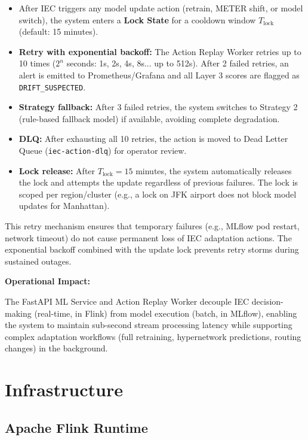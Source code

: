 \begin{itemize}
    \item After IEC triggers any model update action (retrain, METER shift, or model switch), the system enters a \textbf{Lock State} for a cooldown window $T_{\text{lock}}$ (default: 15 minutes).
    \item \textbf{Retry with exponential backoff:} The Action Replay Worker retries up to 10 times ($2^n$ seconds: 1s, 2s, 4s, 8s... up to 512s). After 2 failed retries, an alert is emitted to Prometheus/Grafana and all Layer 3 scores are flagged as \texttt{DRIFT\_SUSPECTED}.
    \item \textbf{Strategy fallback:} After 3 failed retries, the system switches to Strategy 2 (rule-based fallback model) if available, avoiding complete degradation.
    \item \textbf{DLQ:} After exhausting all 10 retries, the action is moved to Dead Letter Queue (\texttt{iec-action-dlq}) for operator review.
    \item \textbf{Lock release:} After $T_{\text{lock}} = 15$ minutes, the system automatically releases the lock and attempts the update regardless of previous failures. The lock is scoped per region/cluster (e.g., a lock on JFK airport does not block model updates for Manhattan).
\end{itemize}

This retry mechanism ensures that temporary failures (e.g., MLflow pod restart, network timeout) do not cause permanent loss of IEC adaptation actions. The exponential backoff combined with the update lock prevents retry storms during sustained outages.

\textbf{Operational Impact:}

The FastAPI ML Service and Action Replay Worker decouple IEC decision-making (real-time, in Flink) from model execution (batch, in MLflow), enabling the system to maintain sub-second stream processing latency while supporting complex adaptation workflows (full retraining, hypernetwork predictions, routing changes) in the background.

\section{Infrastructure}

\subsection{Apache Flink Runtime}

